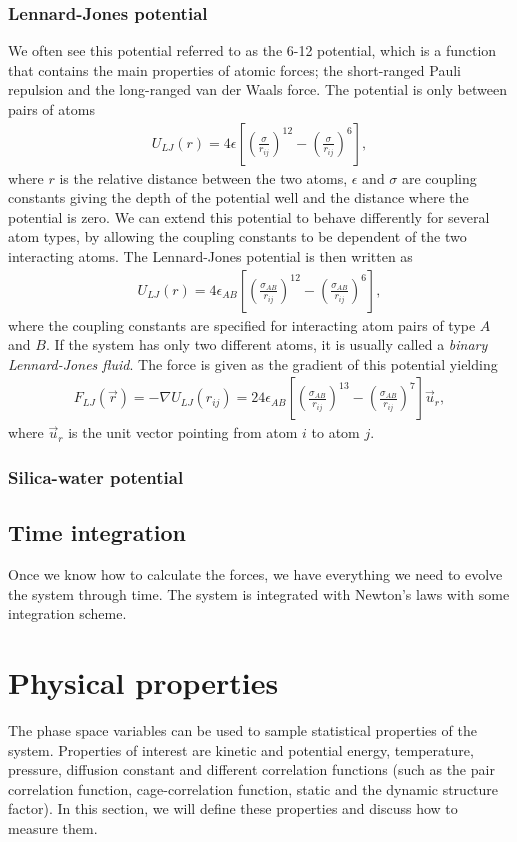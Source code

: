 \subsubsection{Lennard-Jones potential}
We often see this potential referred to as the 6-12 potential, which is a function that contains the main properties of atomic forces; the short-ranged Pauli repulsion and the long-ranged van der Waals force. The potential is only between pairs of atoms
\begin{align}
	\label{eq:md_potential_energy}
	U_{LJ}(r) = 4\epsilon\left[\left(\frac{\sigma}{r_{ij}}\right)^{12} - \left(\frac{\sigma}{r_{ij}}\right)^{6}\right],
\end{align}
where $r$ is the relative distance between the two atoms, $\epsilon$ and $\sigma$ are coupling constants giving the depth of the potential well and the distance where the potential is zero. We can extend this potential to behave differently for several atom types, by allowing the coupling constants to be dependent of the two interacting atoms. The Lennard-Jones potential is then written as
\begin{align}
	U_{LJ}(r) = 4\epsilon_{AB}\left[\left(\frac{\sigma_{AB}}{r_{ij}}\right)^{12} - \left(\frac{\sigma_{AB}}{r_{ij}}\right)^{6}\right],
\end{align}
where the coupling constants are specified for interacting atom pairs of type $A$ and $B$. If the system has only two different atoms, it is usually called a \textit{binary Lennard-Jones fluid}. The force is given as the gradient of this potential yielding 
\begin{align*}
	F_{LJ}(\vec{r}) = -\nabla U_{LJ}(r_{ij}) = 24\epsilon_{AB}\left[\left(\frac{\sigma_{AB}}{r_{ij}}\right)^{13} - \left(\frac{\sigma_{AB}}{r_{ij}}\right)^{7}\right]\vec u_r,
\end{align*}
where $\vec u_r$ is the unit vector pointing from atom $i$ to atom $j$. 
\subsubsection{Silica-water potential}
\subsection{Time integration}
Once we know how to calculate the forces, we have everything we need to evolve the system through time. The system is integrated with Newton's laws with some integration scheme. 

\section{Physical properties}
The phase space variables can be used to sample statistical properties of the system. Properties of interest are kinetic and potential energy, temperature, pressure, diffusion constant and different correlation functions (such as the pair correlation function, cage-correlation function, static and the dynamic structure factor). In this section, we will define these properties and discuss how to measure them.

